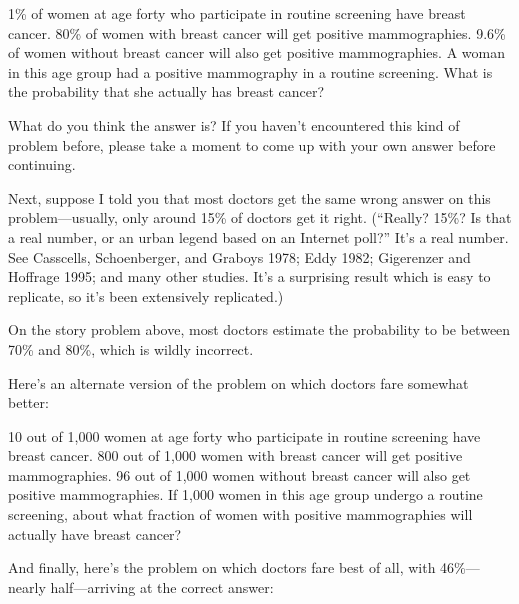{
 1\% of women at age forty who participate in routine screening
have breast cancer. 80\% of women with breast cancer will get positive
mammographies. 9.6\% of women without breast cancer will also get
positive mammographies. A woman in this age group had a positive
mammography in a routine screening. What is the probability that she
actually has breast cancer?}

{
 What do you think the answer is? If you haven't
encountered this kind of problem before, please take a moment to come
up with your own answer before continuing.}

{
 Next, suppose I told you that most doctors get the same wrong
answer on this problem---usually, only around 15\% of doctors get it
right. (``Really? 15\%? Is that a real number, or an
urban legend based on an Internet poll?''
It's a real number. See Casscells, Schoenberger, and
Graboys 1978; Eddy 1982;
Gigerenzer and Hoffrage 1995; and many other
studies. It's a surprising result which is easy to
replicate, so it's been extensively replicated.)}

{
 On the story problem above, most doctors estimate the probability
to be between 70\% and 80\%, which is wildly incorrect.}

{
 Here's an alternate version of the problem on
which doctors fare somewhat better:}

{
 10 out of 1,000 women at age forty who participate in routine
screening have breast cancer. 800 out of 1,000 women with breast cancer
will get positive mammographies. 96 out of 1,000 women without breast
cancer will also get positive mammographies. If 1,000 women in this age
group undergo a routine screening, about what fraction of women with
positive mammographies will actually have breast cancer?}

{
 And finally, here's the problem on which doctors
fare best of all, with 46\%---nearly half---arriving at the correct
answer:}

